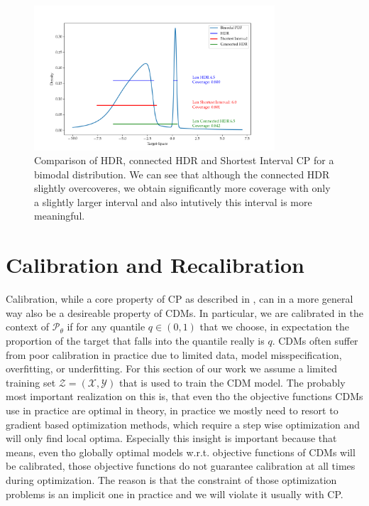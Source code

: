 \begin{figure}
    \centering
    \includegraphics[width=0.8\textwidth]{resources/bimodal_distribution_hdr_vs_shortest_interval.png}
    \caption[Comparison of HDR, connected HDR and Shortest Interval CP]{Comparison of HDR, connected HDR and Shortest Interval CP for a bimodal distribution. We can see that although the connected HDR slightly overcoveres, we obtain significantly more coverage with only a slightly larger interval and also intutively this interval is more meaningful.}
    \label{fig:hdr_vs_shortest_intervals}
\end{figure}


\section{Calibration and Recalibration}\label{sec:calibration}

Calibration, while a core property of CP as described in , can in a more general way also be a desireable property of CDMs. In particular, we are calibrated in the context of $\mathscr{P}_\theta$ if for any quantile $q\in(0,1)$ that we choose, in expectation the proportion of the target that falls into the quantile really is $q$. CDMs often suffer from poor calibration in practice due to limited data, model misspecification, overfitting, or underfitting. For this section of our work we assume a limited training set $\mathcal{Z} = (\mathcal{X}, \mathcal{Y})$ that is used to train the CDM model. The probably most important realization on this is, that even tho the objective functions CDMs use in practice are optimal in theory, in practice we mostly need to resort to gradient based optimization methods, which require a step wise optimization and will only find local optima. Especially this insight is important because that means, even tho globally optimal models w.r.t. objective functions of CDMs will be calibrated, those objective functions do not guarantee calibration at all times during optimization. The reason is that the constraint of those optimization problems is an implicit one in practice and we will violate it usually with CP.

